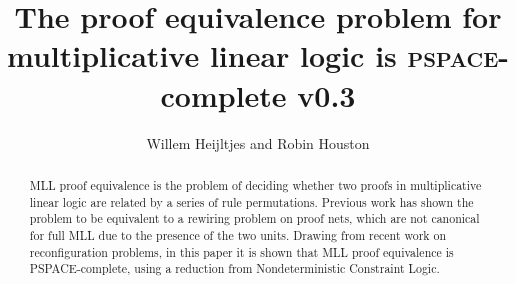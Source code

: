 \documentclass{robinminion}
\author{Willem Heijltjes and Robin Houston}
\title{The proof equivalence problem for multiplicative linear logic is \textsc{pspace}-complete v0.3}
\begin{document}
\maketitle

\begin{abstract}
MLL proof equivalence is the problem of deciding whether two proofs in multiplicative linear logic are related by a series of rule permutations.
%
Previous work has shown the problem to be equivalent to a rewiring problem on proof nets, which are not canonical for full MLL due to the presence of the two units.
%
Drawing from recent work on reconfiguration problems, in this paper it is shown that MLL proof equivalence is PSPACE-complete, using a reduction from Nondeterministic Constraint Logic.
\end{abstract}


%



 
%





\end{document}
